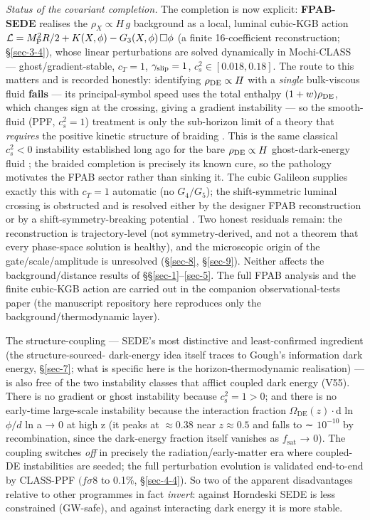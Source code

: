\documentclass[preprint,12pt]{elsarticle}
\begin{document}
\emph{Status of the covariant completion.} The completion is now
explicit: \textbf{FPAB-SEDE} realises the \(\rho_X \propto H\,g\)
background as a local, luminal cubic-KGB action
\(\mathcal{L} = M_{\rm P}^2 R/2 + K(X,\phi) - G_3(X,\phi)\,\Box\phi\) (a
finite 16-coefficient reconstruction; §\ref{sec-3-4}), whose linear
perturbations are solved dynamically in Mochi-CLASS ---
ghost/gradient-stable, \(c_T = 1\), \(\gamma_{\rm slip} = 1\),
\(c_s^2 \in [0.018, 0.18]\). The route to this matters and is recorded
honestly: identifying \(\rho_{\rm DE} \propto H\) with a \emph{single}
bulk-viscous fluid \textbf{fails} --- its principal-symbol speed uses
the total enthalpy \((1+w)\rho_{\rm DE}\), which changes sign at the
crossing, giving a gradient instability --- so the smooth-fluid (PPF,
\(c_s^2=1\)) treatment is only the sub-horizon limit of a theory that
\emph{requires} the positive kinetic structure of braiding
\citep{Crossley:2015evo, AguiSalcedo:2026oef}. This is the same
classical \(c_s^2 < 0\) instability established long ago for the bare
\(\rho_{\rm DE}\propto H\) ghost-dark-energy fluid
\citep{Ebrahimi:2011js}; the braided completion is precisely its known
cure, so the pathology motivates the FPAB sector rather than sinking it.
The cubic Galileon supplies exactly this with \(c_T = 1\) automatic (no
\(G_4/G_5\)); the shift-symmetric luminal crossing is obstructed and is
resolved either by the designer FPAB reconstruction or by a
shift-symmetry-breaking potential \citep{Tsujikawa:2025phc}. Two honest
residuals remain: the reconstruction is trajectory-level (not
symmetry-derived, and not a theorem that every phase-space solution is
healthy), and the microscopic origin of the gate/scale/amplitude is
unresolved (§\ref{sec-8}, §\ref{sec-9}). Neither affects the
background/distance results of §§\ref{sec-1}--\ref{sec-5}. The full FPAB
analysis and the finite cubic-KGB action are carried out in the
companion observational-tests paper \citep{Pandev:2026obstest} (the
manuscript repository here reproduces only the background/thermodynamic
layer).

The structure-coupling --- SEDE's most distinctive and least-confirmed
ingredient (the structure-sourced- dark-energy idea itself traces to
Gough's information dark energy, §\ref{sec-7}; what is specific here is
the horizon-thermodynamic realisation) --- is also free of the two
instability classes that afflict coupled dark energy (V55). There is no
gradient or ghost instability because \(c_{\mathrm{s}}^{2} = 1 > 0\);
and there is no early-time large-scale instability because the
interaction fraction \(\Omega _\mathrm{DE}(z)\cdot\)\textbar d ln
\(\phi /d\) ln a\textbar{} → 0 at high z (it peaks at \(\approx  0.38\)
near \(z \approx  0.5\) and falls to ∼ \(10^{-10}\) by recombination,
since the dark-energy fraction itself vanishes as \(f_{\mathrm{sat}}\) →
0). The coupling switches \emph{off} in precisely the
radiation/early-matter era where coupled-DE instabilities are seeded;
the full perturbation evolution is validated end-to-end by CLASS-PPF
\((f\sigma 8\) to 0.1\%, §\ref{sec-4-4}). So two of the apparent
disadvantages relative to other programmes in fact \emph{invert}:
against Horndeski SEDE is less constrained (GW-safe), and against
interacting dark energy it is more stable.
\end{document}
